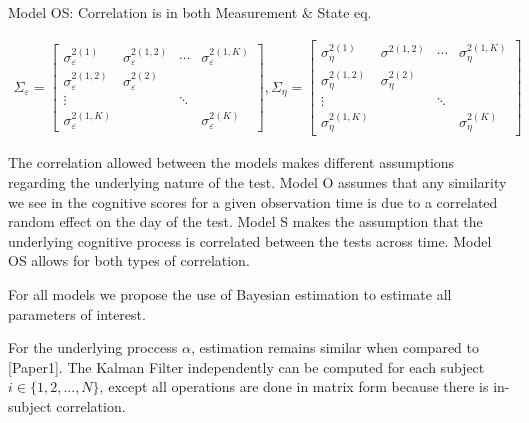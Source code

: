 \documentclass[
]{article}
\begin{document}
Model OS: Correlation is in both Measurement \& State eq.

\begin{equation*}
\begin{aligned}
\Sigma_\varepsilon = 
\begin{bmatrix}
\sigma^{2(1)}_\varepsilon & \sigma^{2(1,2)}_\varepsilon & \cdots & \sigma^{2(1, K)}_\varepsilon\\
\sigma^{2(1,2)}_\varepsilon & \sigma^{2(2)}_\varepsilon\\
\vdots & & \ddots\\
\sigma^{2(1, K)}_\varepsilon & & &\sigma^{2(K)}_\varepsilon
\end{bmatrix},
\Sigma_\eta =
\begin{bmatrix}
\sigma^{2(1)}_\eta & \sigma^{2(1,2)} & \cdots & \sigma^{2(1, K)}_\eta\\
\sigma^{2(1,2)}_\eta & \sigma^{2(2)}_\eta\\
\vdots & & \ddots\\
\sigma^{2(1, K)}_\eta & & &\sigma^{2(K)}_\eta
\end{bmatrix}
\end{aligned}
\end{equation*}

The correlation allowed between the models makes different assumptions regarding the underlying nature of the test. Model O assumes that any similarity we see in the cognitive scores for a given observation time is due to a correlated random effect on the day of the test. Model S makes the assumption that the underlying cognitive process is correlated between the tests across time. Model OS allows for both types of correlation.

For all models we propose the use of Bayesian estimation to estimate all parameters of interest.

For the underlying proccess \(\alpha\), estimation remains similar when compared to {[}Paper1{]}. The Kalman Filter independently can be computed for each subject \(i \in \{1, 2, ..., N\}\), except all operations are done in matrix form because there is in-subject correlation.
\end{document}
